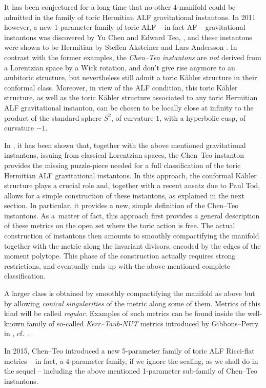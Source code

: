 \documentclass[10pt,a4paper]{amsart}
\numberwithin{equation}{section}
\begin{document}
It has been conjectured for a long time that no other $4$-manifold could be admitted in the family of toric Hermitian ALF gravitational instantons.
In 2011 however, a new 1-parameter family of toric ALF -- in fact AF -- gravitational instantons was discovered by Yu Chen and Edward Teo, \cite{CT2}, and these instantons were shown to be Hermitian by Steffen Aksteiner and Lars Andersson \cite{AA}. In contrast with the former examples, the {\it Chen--Teo instantons} are {\it not} derived from a Lorentzian space by a Wick rotation, and don't give rise anymore to an ambitoric structure, but nevertheless still admit a toric K\"ahler structure in their conformal class. Moreover, in view of the ALF condition, this toric K\"ahler structure, as well as the toric K\"ahler structure associated to any toric Hermitian ALF gravitational instanton, can be chosen to be locally close at infinity to the product of the standard sphere $S^2$, of curvature $1$, with a hyperbolic cusp, of curvature $-1$.

In \cite{BG}, it has been shown that, together with the above mentioned gravitational instantons, issuing from classical Lorentzian spaces, the Chen--Teo instanton provides the missing puzzle-piece needed for a full classification of the toric Hermitian ALF gravitational instantons. In this approach, the conformal K\"ahler structure plays a crucial role and, together with a recent ansatz due to Paul Tod, allows for a simple construction of these instantons, as explained in the next section. In particular, it provides a new, simple definition of the Chen--Teo instantons. As a~matter of fact, this approach first provides a general description of these metrics on the open set where the toric action is free. The actual construction of instantons then amounts to smoothly compactifying the manifold together with the metric along the invariant divisors, encoded by the edges of the moment polytope. This phase of the construction actually requires strong restrictions, and eventually ends up with the above mentioned complete classification.

A larger class is obtained by smoothly compactifying the manifold as above but by allowing {\it conical singularities} of the metric along some of them. Metrics of this kind will be called {\it regular}. Examples of such metrics can be found inside the well-known family of so-called {\it Kerr--Taub-NUT} metrics introduced by Gibbons--Perry in \cite{GP}, cf.\ \cite[Section~7.2.1]{BG}.

In 2015, Chen--Teo introduced a new 5-parameter family of toric ALF Ricci-flat metrics -- in fact, a 4-parameter family, if we ignore the scaling, as we shall do in the sequel -- including the above mentioned 1-parameter sub-family of Chen--Teo instantons.
\end{document}

